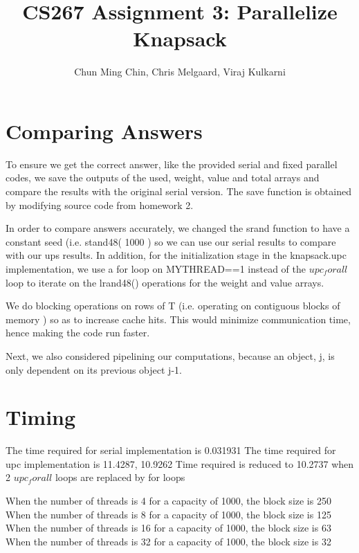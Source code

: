 \documentclass[11pt]{amsart}
\title{CS267 Assignment 3: Parallelize Knapsack}
\author{Chun Ming Chin, Chris Melgaard, Viraj Kulkarni }
\begin{document}
\maketitle




\section{Comparing Answers}

To ensure we get the correct answer, like the provided serial and fixed parallel codes, we save the outputs of the used, weight, value and total arrays and compare the results with the original serial version. The save function is obtained by modifying source code from homework 2.

In order to compare answers accurately, we changed the srand function to have a constant seed (i.e. stand48( 1000 ) so we can use our serial results to compare with our ups results. In addition, for the initialization stage in the knapsack.upc implementation, we use a for loop on MYTHREAD==1 instead of the $upc_forall$ loop to iterate on the lrand48() operations for the weight and value arrays. 

We do blocking operations on rows of T (i.e. operating on contiguous blocks of memory )  so as to increase cache hits. This would minimize communication time, hence making the code run faster. 

Next, we also considered pipelining our computations, because an object, j, is only dependent on its previous object j-1.

\section{Timing}

The time required for serial implementation is 0.031931
The time required for upc implementation is 11.4287, 10.9262
Time required is reduced to 10.2737 when 2 $upc_forall$ loops are replaced by for loops 

When the number of threads is 4 for a capacity of 1000, the block size is 250
When the number of threads is 8 for a capacity of 1000, the block size is 125
When the number of threads is 16 for a capacity of 1000, the block size is 63
When the number of threads is 32 for a capacity of 1000, the block size is 32
\end{document}
